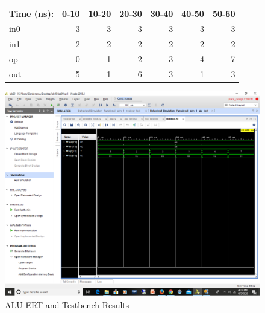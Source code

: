 \documentclass[11pt]{article}
\begin{document}
\begin{figure}[ht]\centering
	\begin{tabular}{l|rrrrrr}
		Time (ns): & 0-10 & 10-20 & 20-30 & 30-40 & 40-50 & 50-60 \\
		\midrule
		in0 & 3 & 3 & 3 & 3 & 3 & 3 \\
		in1 & 2 & 2 & 2 & 2 & 2 & 2 \\
		op & 0 & 1 & 2 & 3 & 4 & 7 \\
		\midrule
		out & 5 & 1 & 6 & 3 & 1 & 3 \\
		\bottomrule
	\end{tabular}\medskip
	
	\includegraphics[width=1.1\textwidth]{alu.png}
	\caption{ALU ERT and Testbench Results}
	\label{fig:sim_with_table}
\end{figure}


\clearpage
\end{document}
